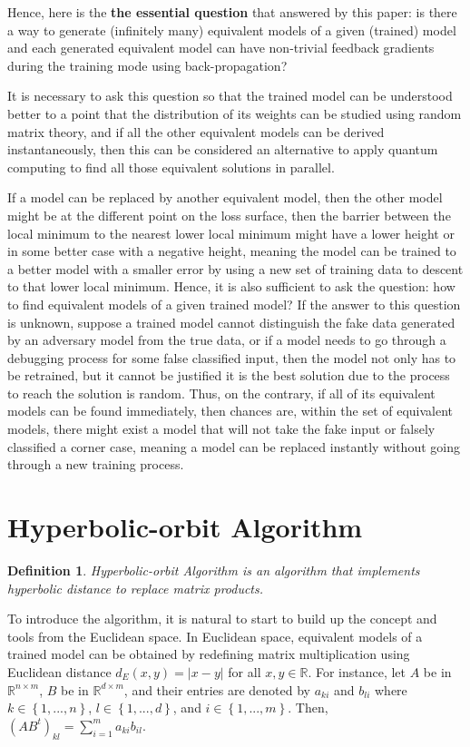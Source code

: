 \documentclass{article}
\theoremstyle{plain}
\theoremstyle{plain} %
\newtheorem{definition}[theorem]{Definition}
\theoremstyle{definition}  %
\theoremstyle{remark}  %
\theoremstyle{plain}
\begin{document}
Hence, here is the \textbf{the essential question} that answered by this paper: is there a way to generate (infinitely many) equivalent models of a given (trained) model and each generated equivalent model can have non-trivial feedback gradients during the training mode using back-propagation? 


It is necessary to ask this question so that the trained model can be understood better to a point that the distribution of its weights can be studied using random matrix theory, and if all the other equivalent models can be derived instantaneously, then this can be considered an alternative to apply quantum computing to find all those equivalent solutions in parallel. 

If a model can be replaced by another equivalent model, then the other model might be at the different point on the loss surface, then the barrier between the local minimum to the nearest lower local minimum might have a lower height or in some better case with a negative height, meaning the model can be trained to a better model with a smaller error by using a new set of training data to descent to that lower local minimum. Hence, it is also sufficient to ask the question: how to find equivalent models of a given trained model? If the answer to this question is unknown, suppose a trained model cannot distinguish the fake data generated by an adversary model from the true data, or if a model needs to go through a debugging process for some false classified input, then the model not only has to be retrained, but it cannot be justified it is the best solution due to the process to reach the solution is random. Thus, on the contrary, if all of its equivalent models can be found immediately, then chances are, within the set of equivalent models, there might exist a model that will not take the fake input or falsely classified a corner case, meaning a model can be replaced instantly without going through a new training process.


\section{Hyperbolic-orbit Algorithm}
\begin{definition}
Hyperbolic-orbit Algorithm is an algorithm that implements hyperbolic distance to replace matrix products.
\end{definition}
To introduce the algorithm, it is natural to start to build up the concept and tools from the Euclidean space. In Euclidean space, equivalent models of a trained model can be obtained by redefining matrix multiplication using Euclidean distance $d_E(x,y)=\vert x-y\vert$ for all $x, y\in\mathbb{R}$. For instance, let $A$ be in $\mathbb{R}^{n\times m}$, $B$ be in $\mathbb{R}^{d\times m}$, and their entries are denoted by $a_{ki}$ and $b_{li}$ where $k\in\left\lbrace 1,...,n\right\rbrace$, $l\in\left\lbrace 1,...,d\right\rbrace$, and $i\in\left\lbrace 1,...,m\right\rbrace$. Then, $\left( A B^t\right)_{kl}=\sum\limits_{i=1}^m a_{ki}b_{il}$.
\end{document}
